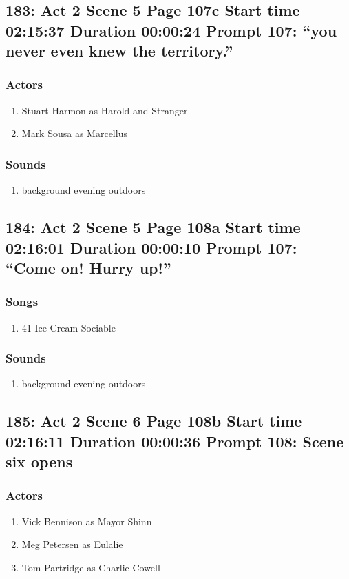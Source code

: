\subsection{183: Act 2 Scene 5 Page 107c Start time 02:15:37 Duration 00:00:24 Prompt 107: ``you never even knew the territory.''}

\subsubsection{Actors}
\begin{enumerate}
\item Stuart Harmon as Harold and Stranger
\item Mark Sousa as Marcellus
\end{enumerate}

\subsubsection{Sounds}
\begin{enumerate}
\item background evening outdoors
\end{enumerate}
\subsection{184: Act 2 Scene 5 Page 108a Start time 02:16:01 Duration 00:00:10 Prompt 107: ``Come on! Hurry up!''}
\subsubsection{Songs}
\begin{enumerate}
\item 41 Ice Cream Sociable
\end{enumerate}\subsubsection{Sounds}
\begin{enumerate}
\item background evening outdoors
\end{enumerate}
\subsection{185: Act 2 Scene 6 Page 108b Start time 02:16:11 Duration 00:00:36 Prompt 108: Scene six opens}

\subsubsection{Actors}
\begin{enumerate}
\item Vick Bennison as Mayor Shinn
\item Meg Petersen as Eulalie
\item Tom Partridge as Charlie Cowell
\end{enumerate}
